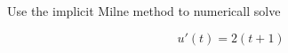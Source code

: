 Use the implicit Milne method to numericall solve

$$
u'(t) = 2(t + 1)
$$

\begin{solution}\ \\\\
\ \\
\end{solution}